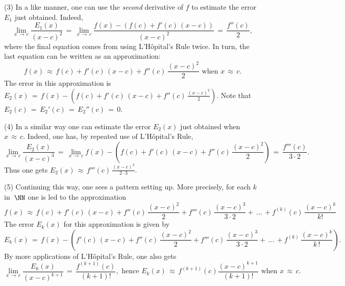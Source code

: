 {        (3) In a like manner, one can use the {\em second} derivative of $f$ to estimate the error $E_{1}$ just obtained.
    Indeed,
        \begin{displaymath}
        \lim_{x \,{\rightarrow}\, c} \frac{E_{1}(x)}{(x-c)^{2}}
     \,=\, 
        \lim_{x \,{\rightarrow}\, c} \frac{f(x) - (f(c) + f'(c)\,(x-c))}{(x-c)^{2}}
     \,=\, 
        \frac{f''(c)}{2},
        \end{displaymath}
    where the final equation comes from using L'H\^{o}pital's Rule twice. In turn, the last equation can be written as an approximation:
        \begin{displaymath}
        f(x) \,{\approx}\, f(c) + f'(c)\,(x-c) + f''(c)\,\frac{(x-c)^{2}}{2} \mbox{ when $x \,{\approx}\, c$}.
        \end{displaymath}
    The error in this approximation is $E_{2}(x) \,=\, {\displaystyle f(x) - \left(f(c) + f'(c)\,(x-c) + f''(c)\,\frac{(x-c)^{2}}{2}\right)}$.
    Note that $E_{2}(c) \,=\, E_{2}'(c) \,=\, E_{2}''(c) \,=\, 0$.

\V

        (4) In a similar way one can estimate the error $E_{2}(x)$ just obtained when $x \,{\approx}\, c$.
    Indeed, one has, by repeated use of L'H\^{o}pital's Rule,
        \begin{displaymath}
        \lim_{x \,{\rightarrow}\, c} \frac{E_{2}(x)}{(x-c)^{3}}
     \,=\, 
        \lim_{x \,{\rightarrow}\, c} f(x) - \left(f(c) + f'(c)\,(x-c) + {\displaystyle f''(c)\,\frac{(x-c)^{2}}{2}}\right)
     \,=\, 
        \frac{f'''(c)}{3{\cdot}2}.
        \end{displaymath}
    Thus one gets $E_{2}(x) \,{\approx}\, {\displaystyle f'''(c)\,\frac{(x-c)^{3}}{2{\cdot}3}}$.

\V

        (5) Continuing this way, one sees a pattern setting up. More precisely, for each $k$ in~${\NN}$ one is led to the approximation
        \begin{displaymath}
        f(x) \,{\approx}\, f(c) + f'(c)\,(x-c) + f''(c)\,\frac{(x-c)^{2}}{2} + f'''(c)\,\frac{(x-c)^{3}}{3{\cdot}2} + \,{\ldots}\, + f^{(k)}(c)\,\frac{(x-c)^{k}}{k!}
        \end{displaymath}
    The error $E_{k}(x)$ for this approximation is given by
        \begin{displaymath}
        E_{k}(x) \,=\, f(x) - \left(f'(c)\,(x-c) + f''(c)\,\frac{(x-c)^{2}}{2} + f'''(c)\,\frac{(x-c)^{3}}{3{\cdot}2} + \,{\ldots}\, + f^{(k)}\,\frac{(x-c)^{k}}{k\,!}\right).
        \end{displaymath}
    By more applications of L'H\^{o}pital's Rule, one also gets
        \begin{displaymath}
        \lim_{x \,{\rightarrow}\, c} \frac{E_{k}(x)}{(x-c)^{k+1}}
     \,=\, 
        \frac{f^{(k+1)}(c)}{(k+1)!}, \mbox{ hence } E_{k}(x) \,{\approx}\, f^{(k+1)}(c)\frac{(x-c)^{k+1}}{(k+1)!} \mbox{ when $x \,{\approx}\, c$}.
        \end{displaymath}

}
